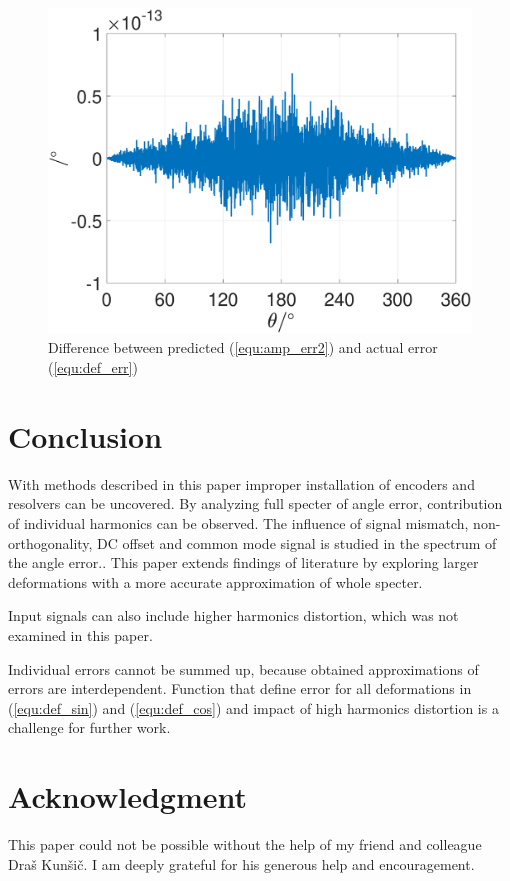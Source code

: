\documentclass[a4paper]{article}
\begin{document}
\begin{figure}[!htb]
	\begin{center}
		\includegraphics[width=\linewidth]{./Slike/razlika_amp.eps}
		\caption{Difference between predicted (\ref{equ:amp_err2}) and actual error (\ref{equ:def_err})} \label{fig:razlika}
	\end{center}
\end{figure}

\section{Conclusion}
With methods described in this paper improper installation of encoders and resolvers can be uncovered. By analyzing full specter of angle error, contribution of individual harmonics can be observed. The influence  of signal mismatch, non-orthogonality, DC offset and common mode signal is studied in the spectrum of the  angle error.. This paper extends findings of literature by exploring larger deformations with a more accurate approximation of whole specter.

Input signals can also include higher harmonics distortion, which was not examined in this paper.

Individual errors cannot be summed up, because obtained approximations of errors are interdependent. Function that define error for all deformations in (\ref{equ:def_sin}) and (\ref{equ:def_cos}) and impact  of high harmonics distortion is a challenge for further work. 

\small
\section*{Acknowledgment}
This paper could not be possible without the help of my friend and colleague Draš Kunšič. I am deeply grateful for his generous help and encouragement.
\end{document}
